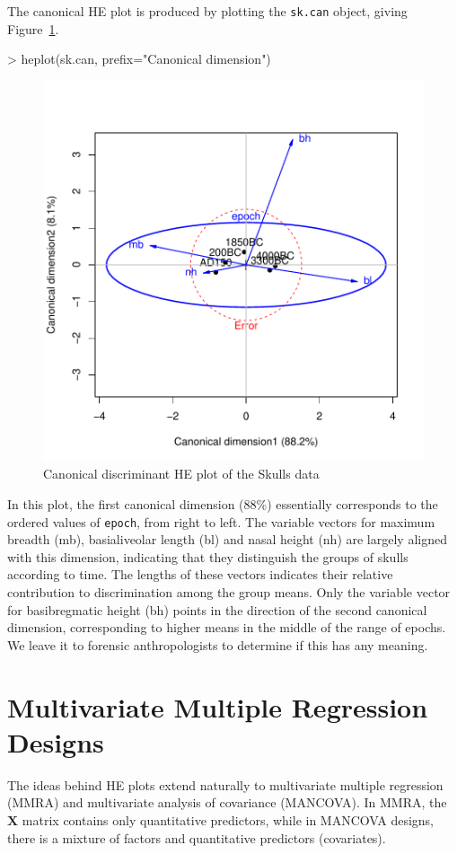 \documentclass[11pt]{article}
\newcommand{\mat}[1]{\ensuremath{\bm{#1}}}
\newcommand{\figref}[1]{Figure~\ref{#1}}
\newcommand{\code}[1]{{\texttt{#1}}}
\begin{document}
The canonical HE plot is produced by plotting the \code{sk.can} object,
giving \figref{fig:skulls-can2}.
\begin{Schunk}
\begin{Sinput}
> heplot(sk.can, prefix="Canonical dimension")
\end{Sinput}
\end{Schunk}
\begin{figure}[htb]
\begin{center}
	\includegraphics[width=.8\textwidth]{fig/plot-skulls-can2}
\caption{Canonical discriminant HE plot of the Skulls data}
\label{fig:skulls-can2}
\end{center}
\end{figure}
In this plot, the first canonical dimension (88\%) essentially
corresponds to the ordered values of \code{epoch}, from right to left.
The variable vectors for maximum breadth (mb), basialiveolar length (bl)
and nasal height (nh) are  largely aligned with this dimension, indicating that
they distinguish the groups of skulls according to time.  The lengths of these
vectors indicates their relative contribution to discrimination among the
group means.  Only the variable vector for basibregmatic height (bh)
points in the direction of the second canonical dimension, corresponding
to higher means in the middle of the range of epochs.  We leave it to
forensic anthropologists to determine if this has any meaning.
 
\section[MMRA Designs]{Multivariate Multiple Regression Designs}
The ideas behind HE plots extend naturally to multivariate multiple
regression (MMRA) and multivariate analysis of covariance (MANCOVA). 
In MMRA, the $\mat{X}$ matrix contains only quantitative predictors, while
in MANCOVA designs, there is a mixture of
factors and quantitative predictors (covariates).  
\end{document}
